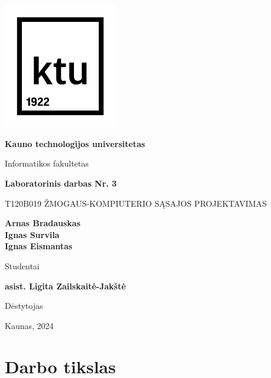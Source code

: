 \documentclass[14pt]{extarticle}
\begin{document}
\begin{titlepage}
	\begin{center}
		\includegraphics[width=5cm]{images/ktu_logo.png}

		\textbf{Kauno technologijos universitetas}

		Informatikos fakultetas

		\vspace{3cm}

		\textbf{Laboratorinis darbas Nr. 3}

		\vspace{0.5cm}
		T120B019 ŽMOGAUS-KOMPIUTERIO SĄSAJOS PROJEKTAVIMAS

	\end{center}

	\begin{flushright}

		\vfill

		\textbf{Arnas Bradauskas} \\
		\textbf{Ignas Survila} \\
		\textbf{Ignas Eismantas}

		Studentai

		\vspace{0.2cm}

		\textbf{asist. Ligita Zailskaitė-Jakštė}

		Dėstytojas

	\end{flushright}

	\begin{center}
		Kaunas, 2024
	\end{center}

\end{titlepage}

\tableofcontents

\clearpage

\section{Darbo tikslas}
\end{document}
